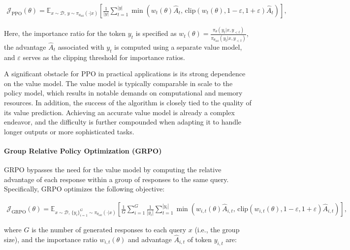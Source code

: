 \begin{align}
\mathcal{J}_\text{PPO}(\theta) = \mathbb{E}_{ x \sim \mathcal{D},\, y \sim \pi_{\theta_\text{old}}( \cdot | x) }
\left[ \frac{1}{|y|} \sum_{t=1}^{|y|} 
\min \left( w_{t}(\theta) \widehat{A}_{t},  \, \mathrm{clip} \left( w_{t}(\theta), 1 - {\varepsilon}, 1 + {\varepsilon}\right) \widehat{A}_{t} \right)
\right],
\end{align}

Here, the importance ratio for the token $y_t$ is specified as $w_{t}(\theta) = \frac{ \pi_{\theta} (y_{t} | x, y_{<t}) }{ \pi_{\theta_\text{old}} (y_{t} | x,y_{<t})}$, the advantage $\widehat{A}_{t}$ associated with $y_t$ is computed using a separate value model, and $\varepsilon$ serves as the clipping threshold for importance ratios.

A significant obstacle for PPO in practical applications is its strong dependence on the value model. The value model is typically comparable in scale to the policy model, which results in notable demands on computational and memory resources. In addition, the success of the algorithm is closely tied to the quality of its value prediction. Achieving an accurate value model is already a complex endeavor, and the difficulty is further compounded when adapting it to handle longer outputs or more sophisticated tasks.

\paragraph{Group Relative Policy Optimization (GRPO)} GRPO \citep{grpo} bypasses the need for the value model by computing the relative advantage of each response within a group of responses to the same query. Specifically, GRPO optimizes the following objective:

\begin{align}
\label{equ:grpo}
\mathcal{J}_\text{GRPO}(\theta) = \mathbb{E}_{ x \sim \mathcal{D},\, \{y_i\}_{i=1}^G \sim \pi_{\theta_\text{old}}( \cdot | x) }
\left[ \frac{1}{G} \sum_{i=1}^{G} \frac{1}{|y_i|} \sum_{t=1}^{|y_i|} 
\min \left( w_{i,t}(\theta) \widehat{A}_{i,t},  \, \mathrm{clip} \left( w_{i,t}(\theta), 1 - {\varepsilon}, 1 + {\varepsilon}\right) \widehat{A}_{i,t} \right)
\right],
\end{align}

where $G$ is the number of generated responses to each query $x$ (i.e., the group size), and the importance ratio $w_{i,t}(\theta)$ and advantage $\widehat{A}_{i,t}$ of token $y_{i,t}$ are:

